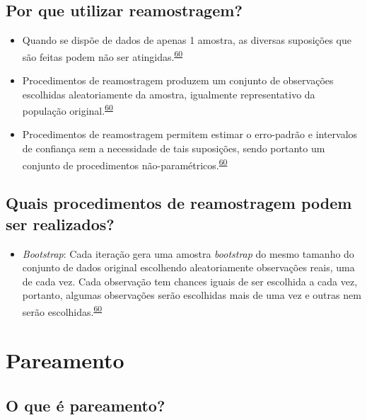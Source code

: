 \documentclass[
]{book}
\providecommand{\tightlist}{%
  \setlength{\itemsep}{0pt}\setlength{\parskip}{0pt}}
\begin{document}
\hypertarget{por-que-utilizar-reamostragem}{%
\subsection{Por que utilizar reamostragem?}\label{por-que-utilizar-reamostragem}}

\begin{itemize}
\item
  Quando se dispõe de dados de apenas 1 amostra, as diversas suposições que são feitas podem não ser atingidas.\textsuperscript{\protect\hyperlink{ref-Bland2015}{60}}
\item
  Procedimentos de reamostragem produzem um conjunto de observações escolhidas aleatoriamente da amostra, igualmente representativo da população original.\textsuperscript{\protect\hyperlink{ref-Bland2015}{60}}
\item
  Procedimentos de reamostragem permitem estimar o erro-padrão e intervalos de confiança sem a necessidade de tais suposições, sendo portanto um conjunto de procedimentos não-paramétricos.\textsuperscript{\protect\hyperlink{ref-Bland2015}{60}}
\end{itemize}

\hypertarget{quais-procedimentos-de-reamostragem-podem-ser-realizados}{%
\subsection{Quais procedimentos de reamostragem podem ser realizados?}\label{quais-procedimentos-de-reamostragem-podem-ser-realizados}}

\begin{itemize}
\tightlist
\item
  \emph{Bootstrap}: Cada iteração gera uma amostra \emph{bootstrap} do mesmo tamanho do conjunto de dados original escolhendo aleatoriamente observações reais, uma de cada vez. Cada observação tem chances iguais de ser escolhida a cada vez, portanto, algumas observações serão escolhidas mais de uma vez e outras nem serão escolhidas.\textsuperscript{\protect\hyperlink{ref-Bland2015}{60}}
\end{itemize}

\hypertarget{pareamento}{%
\section{Pareamento}\label{pareamento}}

\hypertarget{o-que-uxe9-pareamento}{%
\subsection{O que é pareamento?}\label{o-que-uxe9-pareamento}}
\end{document}
